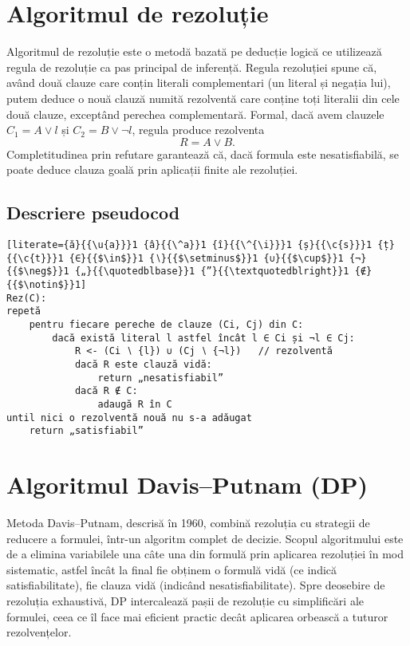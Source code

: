 \documentclass[12pt]{article}
\begin{document}
\section{Algoritmul de rezoluție}
Algoritmul de rezoluție este o metodă bazată pe deducție logică ce utilizează regula de rezoluție ca pas principal de inferență. Regula rezoluției spune că, având două clauze care conțin literali complementari (un literal și negația lui), putem deduce o nouă clauză numită rezolventă care conține toți literalii din cele două clauze, exceptând perechea complementară.\cite{handbook} Formal, dacă avem clauzele $C_1 = A \lor l$ și $C_2 = B \lor \neg l$, regula produce rezolventa
\[
  R = A \lor B.
\]
Completitudinea prin refutare garantează că, dacă formula este nesatisfiabilă, se poate deduce clauza goală prin aplicații finite ale rezoluției.
\newpage
\subsection{Descriere pseudocod}
\begin{lstlisting}[literate={ă}{{\u{a}}}1 {â}{{\^a}}1 {î}{{\^{\i}}}1 {ș}{{\c{s}}}1 {ț}{{\c{t}}}1 {∈}{{$\in$}}1 {∖}{{$\setminus$}}1 {∪}{{$\cup$}}1 {¬}{{$\neg$}}1 {„}{{\quotedblbase}}1 {”}{{\textquotedblright}}1 {∉}{{$\notin$}}1]
Rez(C):
repetă
    pentru fiecare pereche de clauze (Ci, Cj) din C:
        dacă există literal l astfel încât l ∈ Ci și ¬l ∈ Cj:
            R <- (Ci ∖ {l}) ∪ (Cj ∖ {¬l})   // rezolventă
            dacă R este clauză vidă:
                return „nesatisfiabil”
            dacă R ∉ C:
                adaugă R în C
until nici o rezolventă nouă nu s-a adăugat
    return „satisfiabil”
\end{lstlisting}

\section{Algoritmul Davis--Putnam (DP)}
Metoda Davis–Putnam, descrisă în 1960, combină rezoluția cu strategii de reducere a formulei, într-un algoritm complet de decizie. Scopul algoritmului este de a elimina variabilele una câte una din formulă prin aplicarea rezoluției în mod sistematic, astfel încât la final fie obținem o formulă vidă (ce indică satisfiabilitate), fie clauza vidă (indicând nesatisfiabilitate). \cite{davis-putnam1960} Spre deosebire de rezoluția exhaustivă, DP intercalează pașii de rezoluție cu simplificări ale formulei, ceea ce îl face mai eficient practic decât aplicarea orbească a tuturor rezolvențelor.
\end{document}
